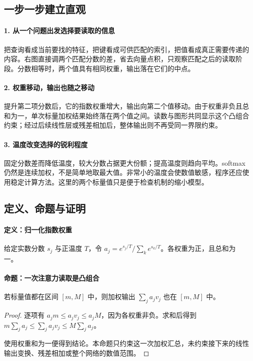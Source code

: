 \subsection*{一步一步建立直观}

\paragraph{1. 从一个问题出发选择要读取的信息}

把查询看成当前要找的特征，把键看成可供匹配的索引，把值看成真正需要传递的内容。右图直接调两个匹配分数的差，省去向量点积，只观察匹配之后的读取阶段。分数相等时，两个值具有相同权重，输出落在它们的中点。



\paragraph{2. 权重移动，输出也随之移动}

提升第二项分数后，它的指数权重增大，输出向第二个值移动。由于权重非负且总和为一，单次标量加权结果始终落在两个值之间。读数与图形共同显示这个凸组合约束；经过后续线性层或残差相加后，整体输出则不再受同一界限约束。



\paragraph{3. 温度改变选择的锐利程度}

固定分数差而降低温度，较大分数占据更大份额；提高温度则趋向平均。softmax 仍然是连续加权，不是简单地取最大值。非常小的温度会使数值敏感，程序还应使用稳定计算方法。这里的两个标量值只是便于检查机制的缩小模型。



\subsection*{定义、命题与证明}

\paragraph{定义：归一化指数权重}

给定实数分数 $s_j$ 与正温度 $T$，令 $a_j=e^{s_j/T}/\sum_k e^{s_k/T}$。各权重为正，且总和为一。

\paragraph{命题：一次注意力读取是凸组合}

若标量值都在区间 $[m,M]$ 中，则加权输出 $\sum_j a_jv_j$ 也在 $[m,M]$ 中。

\begin{proof}

逐项有 $a_jm\le a_jv_j\le a_jM$，因为各权重非负。求和后得到 $m\sum_j a_j\le\sum_j a_jv_j\le M\sum_j a_j$。

使用权重和为一便得到结论。本命题只约束这一次加权汇总，未约束接下来的线性输出变换、残差相加或整个网络的数值范围。

\end{proof}
